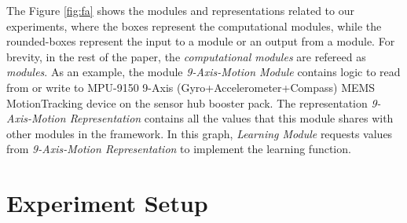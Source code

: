 \documentclass[letterpaper]{article}
\begin{document}
\begin{sloppy}
The Figure \ref{fig:fa} shows the modules and representations related to our 
experiments, where the boxes represent the computational modules, while the rounded-boxes represent 
the input to a module or an output from a module. For brevity, in the rest of the paper, the  
{\em computational modules} are refereed as  {\em modules}. As an example, the module {\em 
9-Axis-Motion Module} contains logic to read from or write to MPU-9150 9-Axis 
(Gyro+Accelerometer+Compass) MEMS MotionTracking device on the sensor hub booster pack. The 
representation {\em 9-Axis-Motion Representation} contains all the values that 
this module shares with other modules in the framework. In this graph, {\em 
Learning Module} requests values from {\em 9-Axis-Motion Representation} to implement the learning 
function. 
  


\section{Experiment Setup}


\end{sloppy}
\end{document}
